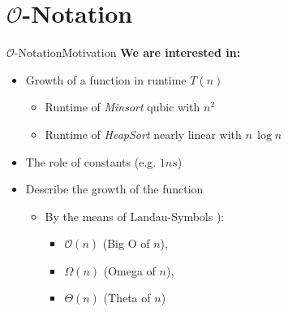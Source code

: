 \section{\texorpdfstring{$\mathcal{O}$}{O}-Notation}


\begin{frame}{$\mathcal{O}$-Notation}{Motivation}
  \textbf{We are interested in:}
  \begin{itemize}
    \item
      Growth of a function in runtime $T(n)$
    \begin{itemize}
      \item
        Runtime of \textit{Minsort} qubic with $n^2$
      \item
         Runtime of \textit{HeapSort} nearly linear with $n \, \log n$
    \end{itemize}
    \item
      The role of constants (e.g. $1ns$)
    \item
      Describe the growth of the function
    \begin{itemize}
      \item
        By the means of Landau-Symbols \cite{wikipedia_big_o_notation}):
            \begin{itemize}
                \item
                    {\color{Mittel-Blau}$\mathcal{O}(n)$} (Big O of $n$),
                \item
                    {\color{Mittel-Blau}$\Omega (n)$} (Omega of $n$),
                \item
                    {\color{Mittel-Blau}$\Theta (n)$} (Theta of $n$)
            \end{itemize}
    \end{itemize}
  \end{itemize}
\end{frame}


